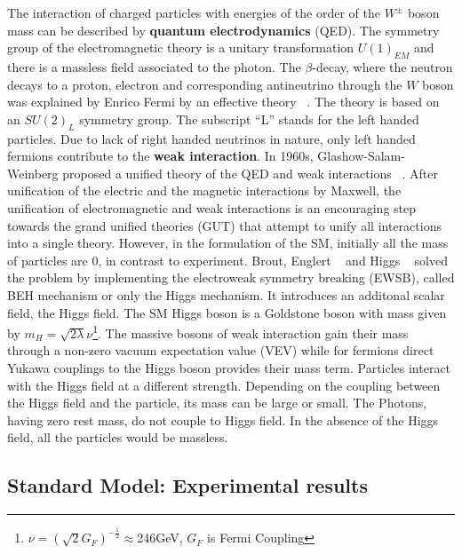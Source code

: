 The interaction of charged particles with energies of the order of the $W^{\pm}$ boson mass can be described  by \textbf{quantum electrodynamics} (QED). The symmetry group of the electromagnetic theory is a unitary transformation $U(1)_{EM}$ and there is a massless field associated to the photon.
The $\beta$-decay, where the neutron decays to a proton, electron and corresponding antineutrino through the $W$ boson was explained by Enrico Fermi by an effective theory ~\cite{Fermi}. The theory is based on an $SU(2)_L$ symmetry group. The subscript “L” stands for the left handed particles. Due to lack of right handed neutrinos in nature, only left handed fermions contribute to the \textbf{weak interaction}.
In 1960s, Glashow-Salam-Weinberg proposed a unified theory of the QED and weak interactions ~\cite{glashow,salam,weinberg}.
After unification of the electric and the magnetic interactions by Maxwell, the unification of electromagnetic and weak interactions is an encouraging step towards the grand unified theories (GUT) that attempt to unify all interactions into a single theory. 
However, in the formulation of the SM, initially all the mass of particles are 0, in contrast to experiment.
Brout, Englert ~\cite{higgs1} and Higgs ~\cite{higgs2} solved the problem by implementing the electroweak symmetry breaking (EWSB), called BEH mechanism or only the Higgs mechanism. It introduces an additonal scalar field, the Higgs field. The SM Higgs boson is a Goldstone boson with mass given by $m_H=\sqrt{2\lambda}\nu$\footnote{$\nu=(\sqrt{2}G_F)^{-\frac{1}{2}}\approx$246GeV, $G_F$ is Fermi Coupling}. The massive bosons of weak interaction gain their mass through a non-zero vacuum expectation value (VEV) while for fermions direct Yukawa couplings to the Higgs boson provides their mass term.
Particles interact with the Higgs field at a different strength. Depending on the coupling between the Higgs field and the particle, its mass can be large or small. The Photons, having zero rest mass, do not couple to Higgs field. In the absence of the Higgs field, all the particles would be massless. 




\subsection{Standard Model: Experimental results}
\label{sec:StandardModelExp}

